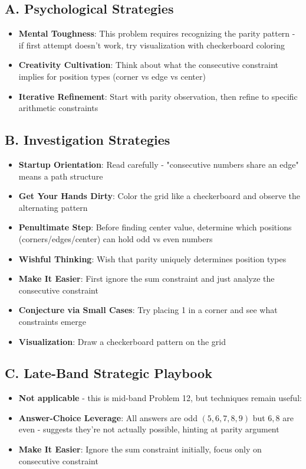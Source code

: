 \documentclass[11pt]{article}
\begin{document}
\begin{strategicbox}
\subsection*{A. Psychological Strategies}
\begin{itemize}[leftmargin=*]
    \item \textbf{Mental Toughness}: This problem requires recognizing the parity pattern - if first attempt doesn't work, try visualization with checkerboard coloring
    \item \textbf{Creativity Cultivation}: Think about what the consecutive constraint implies for position types (corner vs edge vs center)
    \item \textbf{Iterative Refinement}: Start with parity observation, then refine to specific arithmetic constraints
\end{itemize}

\subsection*{B. Investigation Strategies}
\begin{itemize}[leftmargin=*]
    \item \textbf{Startup Orientation}: Read carefully - "consecutive numbers share an edge" means a path structure
    \item \textbf{Get Your Hands Dirty}: Color the grid like a checkerboard and observe the alternating pattern
    \item \textbf{Penultimate Step}: Before finding center value, determine which positions (corners/edges/center) can hold odd vs even numbers
    \item \textbf{Wishful Thinking}: Wish that parity uniquely determines position types
    \item \textbf{Make It Easier}: First ignore the sum constraint and just analyze the consecutive constraint
    \item \textbf{Conjecture via Small Cases}: Try placing 1 in a corner and see what constraints emerge
    \item \textbf{Visualization}: Draw a checkerboard pattern on the grid
\end{itemize}

\subsection*{C. Late-Band Strategic Playbook}
\begin{itemize}[leftmargin=*]
    \item \textbf{Not applicable} - this is mid-band Problem 12, but techniques remain useful:
    \item \textbf{Answer-Choice Leverage}: All answers are odd $(5,6,7,8,9)$ but $6,8$ are even - suggests they're not actually possible, hinting at parity argument
    \item \textbf{Make It Easier}: Ignore the sum constraint initially, focus only on consecutive constraint
\end{itemize}


\end{strategicbox}
\end{document}
